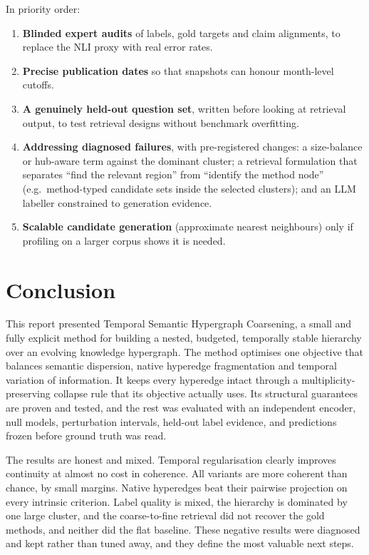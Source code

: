 \documentclass[11pt,a4paper]{article}
\theoremstyle{remark}
\begin{document}
In priority order:
\begin{enumerate}
  \item \textbf{Blinded expert audits} of labels, gold targets and claim alignments, to replace
        the NLI proxy with real error rates.
  \item \textbf{Precise publication dates} so that snapshots can honour month-level cutoffs.
  \item \textbf{A genuinely held-out question set}, written before looking at retrieval output,
        to test retrieval designs without benchmark overfitting.
  \item \textbf{Addressing diagnosed failures}, with pre-registered changes: a size-balance or
        hub-aware term against the dominant cluster; a retrieval formulation that separates
        ``find the relevant region'' from ``identify the method node'' (e.g.\ method-typed
        candidate sets inside the selected clusters); and an LLM labeller constrained to
        generation evidence.
  \item \textbf{Scalable candidate generation} (approximate nearest neighbours) only if
        profiling on a larger corpus shows it is needed.
\end{enumerate}

\section{Conclusion}
\label{sec:conclusion}

This report presented Temporal Semantic Hypergraph Coarsening, a small and fully explicit
method for building a nested, budgeted, temporally stable hierarchy over an evolving knowledge
hypergraph. The method optimises one objective that balances semantic dispersion, native
hyperedge fragmentation and temporal variation of information. It keeps every hyperedge intact
through a multiplicity-preserving collapse rule that its objective actually uses. Its structural
guarantees are proven and tested, and the rest was evaluated with an independent encoder, null
models, perturbation intervals, held-out label evidence, and predictions frozen before ground
truth was read.

The results are honest and mixed. Temporal regularisation clearly improves continuity at almost
no cost in coherence. All variants are more coherent than chance, by small margins. Native
hyperedges beat their pairwise projection on every intrinsic criterion. Label quality is mixed,
the hierarchy is dominated by one large cluster, and the coarse-to-fine retrieval did not recover
the gold methods, and neither did the flat baseline. These negative results were diagnosed and
kept rather than tuned away, and they define the most valuable next steps.
\end{document}
